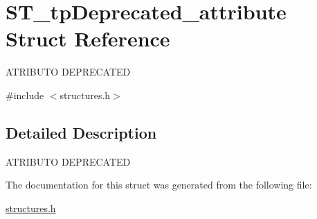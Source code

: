 \hypertarget{structST__tpDeprecated__attribute}{}\section{S\+T\+\_\+tp\+Deprecated\+\_\+attribute Struct Reference}
\label{structST__tpDeprecated__attribute}




 A\+T\+R\+I\+B\+U\+TO D\+E\+P\+R\+E\+C\+A\+T\+ED  




{\ttfamily \#include $<$structures.\+h$>$}



\subsection{Detailed Description}


 A\+T\+R\+I\+B\+U\+TO D\+E\+P\+R\+E\+C\+A\+T\+ED 

The documentation for this struct was generated from the following file\+:\begin{DoxyCompactItemize}
\item 
\mbox{\hyperlink{structures_8h}{structures.\+h}}\end{DoxyCompactItemize}
